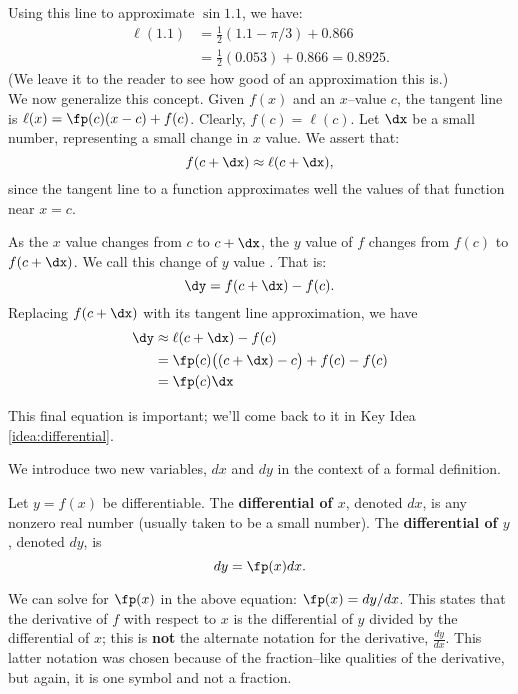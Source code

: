 Using this line to approximate $\sin 1.1$, we have:
\begin{align*}
	\ell(1.1) &= \frac12(1.1-\pi/3)+0.866 \\
					&= \frac12(0.053)+0.866 = 0.8925.
\end{align*}
(We leave it to the reader to see how good of an approximation this is.)\\

We now generalize this concept. Given $f(x)$ and an $x$--value $c$,  the tangent line is $\ell(x) = \fp(c)(x-c)+f(c)$. Clearly, $f(c) = \ell(c)$. Let $\dx$ be a small number, representing a small change in $x$ value. We assert that:
$$f(c+\dx) \approx \ell(c+\dx),$$ since the tangent line to a function approximates well the values of that function near $x=c$. 

As the $x$ value changes from $c$ to $c+\dx$, the $y$ value of $f$ changes from $f(c)$ to $f(c+\dx)$. We call this change of $y$ value \dy. That is:
$$\dy = f(c+\dx)-f(c).$$
Replacing $f(c+\dx)$ with its tangent line approximation, we have 
\begin{align} \dy &\approx \ell(c+\dx) - f(c) \notag\\
								&= \fp(c)\big((c+\dx)-c\big)+f(c) - f(c)\notag \\
								&=\fp(c)\dx		\label{eq:differential}
\end{align}

This final equation is important; we'll come back to it in Key Idea \ref{idea:differential}.

We introduce two new variables, $dx$ and $dy$ in the context of a formal definition. %

{Let $y=f(x)$ be differentiable. The \textbf{differential of $x$}, denoted $dx$, is any nonzero real number (usually taken to be a small number). The \textbf{differential of $y$}, denoted $dy$, is $$dy = \fp(x)dx.$$
}

We can solve for $\fp(x)$ in the above equation: $\fp(x) = dy/dx$. This states that the derivative of $f$ with respect to $x$ is the differential of $y$ divided by the differential of $x$; this is \textbf{not} the alternate notation for the derivative, $\frac{dy}{dx}$. This latter notation was chosen because of the fraction--like qualities of the derivative, but again, it is one symbol and not a fraction.

